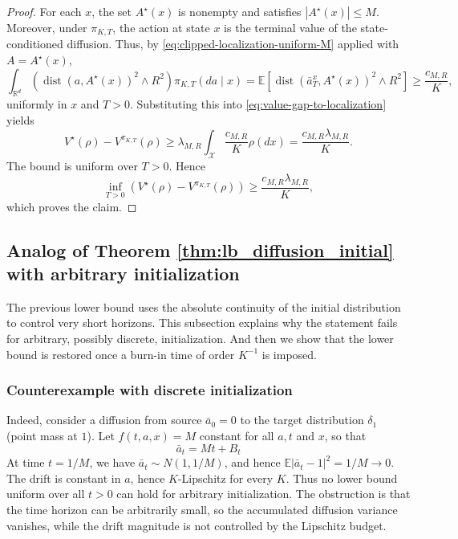 \documentclass{article}
\newcommand{\1}{\mathbbm{1}}
\numberwithin{equation}{section}
\def\to{\rightarrow}
\begin{document}
\begin{proof}
For each \(x\), the set \(A^\star(x)\) is nonempty and satisfies
\(|A^\star(x)|\le M\). Moreover, under \(\pi_{K,T}\), the action at state
\(x\) is the terminal value of the state-conditioned diffusion. Thus, by
\eqref{eq:clipped-localization-uniform-M} applied with
\(A=A^\star(x)\),
\[
\int_{\mathbb R^d}
\left(
    \operatorname{dist}(a,A^\star(x))^2\wedge R^2
\right)
\pi_{K,T}(da\mid x)
=
\mathbb E\left[
    \operatorname{dist}(\bar a_T^x,A^\star(x))^2\wedge R^2
\right]
\ge
\frac{c_{M,R}}{K},
\]
uniformly in \(x\) and \(T>0\). Substituting this into
\eqref{eq:value-gap-to-localization} yields
\[
V^\star(\rho)-V^{\pi_{K,T}}(\rho)
\ge
\lambda_{M,R}
\int_{\mathcal X}
\frac{c_{M,R}}{K}\rho(dx)
=
\frac{c_{M,R}\lambda_{M,R}}{K}.
\]
The bound is uniform over \(T>0\). Hence
\[
    \inf_{T>0}
    \left(
        V^\star(\rho)-V^{\pi_{K,T}}(\rho)
    \right)
    \ge
    \frac{c_{M,R}\lambda_{M,R}}{K},
\]
which proves the claim.
\end{proof}

\subsection{Analog of Theorem \ref{thm:lb_diffusion_initial} with arbitrary initialization}\label{sec:statement_proof_cor_35}

The previous lower bound uses the absolute continuity of the initial distribution to control very short horizons. This subsection explains why the statement fails for arbitrary, possibly discrete, initialization. And then we show that the lower bound is restored once a burn-in time of order \(K^{-1}\) is imposed.


\subsubsection{Counterexample with discrete initialization}
Indeed, consider a diffusion from source $\bar{a}_{0}=0$ to the target distribution $\delta_{1}$ (point mass at $1$). Let $f(t, a, x)=M$ constant for all $a,t$ and $x$, so that
$$\bar{a}_{t}=Mt+B_{t}$$
At time \(t=1/M\), we have \(\bar a_t\sim N(1,1/M)\), and hence
\(\mathbb E|\bar a_t-1|^2=1/M\to0\). The drift is constant in \(a\), hence
\(K\)-Lipschitz for every \(K\). Thus no lower bound uniform over all
\(t>0\) can hold for arbitrary initialization. The obstruction is that the
time horizon can be arbitrarily small, so the accumulated diffusion variance
vanishes, while the drift magnitude is not controlled by the Lipschitz budget.
\end{document}
